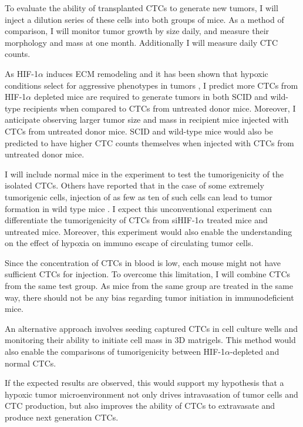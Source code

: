 \documentclass[11pts]{article}
\begin{document}
\noindent To evaluate the ability of transplanted CTCs to generate new tumors, I will inject a dilution series of these cells into both groups of mice. As a method of comparison, I will monitor tumor growth by size daily, and measure their morphology and mass at one month. Additionally I will measure daily CTC counts. 
\newline

\noindent As HIF-1$\alpha$ induces ECM remodeling and it has been shown that hypoxic conditions select for aggressive phenotypes in tumors \cite{Ameri:2010qf}, I predict more CTCs from HIF-1$\alpha$ depleted mice are required to generate tumors in both SCID and wild-type recipients when compared to CTCs from untreated donor mice. Moreover, I anticipate observing larger tumor size and mass in recipient mice injected with CTCs from untreated donor mice. SCID and wild-type mice would also be predicted to have higher CTC counts themselves when injected with CTCs from untreated donor mice. \newline

\noindent I will include normal mice in the experiment to test the tumorigenicity of the isolated CTCs. Others have reported that in the case of some extremely tumorigenic cells, injection of as few as ten of such cells can lead to tumor formation in wild type mice \cite{Liu:2012ys}. I expect this unconventional experiment can differentiate the tumorigenicity of CTCs from siHIF-1$\alpha$ treated mice and untreated mice. Moreover, this experiment would also enable the understanding on the effect of hypoxia on immuno escape of circulating tumor cells. 
 \newline

\noindent Since the concentration of CTCs in blood is low, each mouse might not have sufficient CTCs for injection. To overcome this limitation, I will combine CTCs from the same test group. As mice from the same group are treated in the same way, there should not be any bias regarding tumor initiation in immunodeficient mice. \newline

\noindent An alternative approach involves seeding captured CTCs in cell culture wells and monitoring their ability to initiate cell mass in 3D matrigels. This method would also enable the comparisons of tumorigenicity between HIF-1$\alpha$-depleted and normal CTCs. 
\newline

\noindent If the expected results are observed, this would support my hypothesis that a hypoxic tumor microenvironment not only drives intravasation of tumor cells and CTC production, but also improves the ability of CTCs to extravasate and produce next generation CTCs. 
\newline
\end{document}
